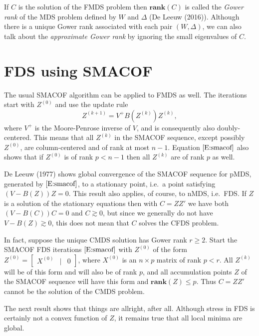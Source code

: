 \documentclass[
  12pt,
]{article}
\begin{document}
If \(C\) is the solution of the FMDS problem then \(\mathbf{rank}(C)\)
is called the \emph{Gower rank} of the MDS problem defined by \(W\) and
\(\Delta\) (De Leeuw (2016)). Although there is a unique Gower rank
associated with each pair \((W,\Delta)\), we can also talk about the
\emph{approximate Gower rank} by ignoring the small eigenvalues of
\(C\).

\hypertarget{fds-using-smacof}{%
\section{FDS using SMACOF}\label{fds-using-smacof}}

The usual SMACOF algorithm can be applied to FMDS as well. The
iterations start with \(Z^{(0)}\) and use the update rule
\begin{equation}\label{E:smacof}
Z^{(k+1)}=V^+B(Z^{(k)})Z^{(k)},
\end{equation} where \(V^+\) is the Moore-Penrose inverse of \(V\), and
is consequently also doubly-centered. This means that all \(Z^{(k)}\) in
the SMACOF sequence, except possibly \(Z^{(0)}\), are column-centered
and of rank at most \(n-1\). Equation \(\eqref{E:smacof}\) also shows
that if \(Z^{(0)}\) is of rank \(p<n-1\) then all \(Z^{(k)}\) are of
rank \(p\) as well.

De Leeuw (1977) shows global convergence of the SMACOF sequence for
pMDS, generated by \(\eqref{E:smacof}\), to a stationary point, i.e.~a
point satisfying \((V-B(Z))Z=0\). This result also applies, of course,
to nMDS, i.e.~FDS. If \(Z\) is a solution of the stationary equations
then with \(C=ZZ'\) we have both \((V-B(C))C=0\) and \(C\gtrsim 0\), but
since we generally do not have \(V-B(Z)\gtrsim 0\), this does not mean
that \(C\) solves the CFDS problem.

In fact, suppose the unique CMDS solution has Gower rank \(r\geq 2\).
Start the SMACOF FDS iterations \(\eqref{E:smacof}\) with \(Z^{(0)}\) of
the form \(Z^{(0)}=\begin{bmatrix}X^{(0)}&\mid&0\end{bmatrix}\), where
\(X^{(0)}\) is an \(n\times p\) matrix of rank \(p<r\). All \(Z^{(k)}\)
will be of this form and will also be of rank \(p\), and all
accumulation points \(Z\) of the SMACOF sequence will have this form and
\(\mathbf{rank}(Z)\leq p\). Thus \(C=ZZ'\) cannot be the solution of the
CMDS problem.

The next result shows that things are allright, after all. Although
stress in FDS is certainly not a convex function of \(Z\), it remains
true that all local minima are global.
\end{document}
